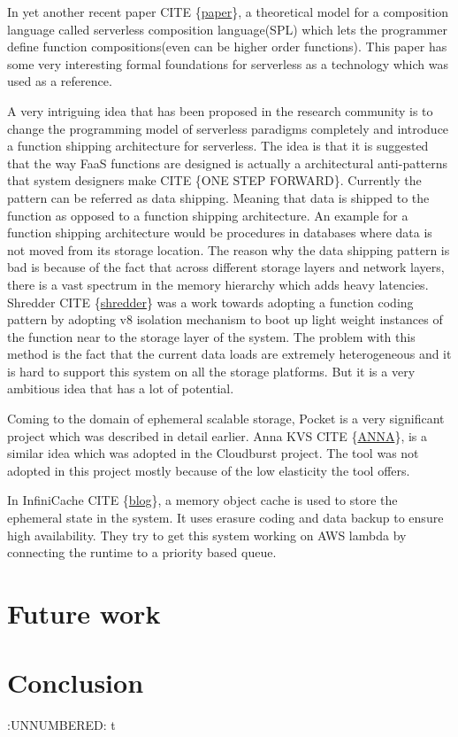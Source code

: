 \documentclass[12pt,titlepage]{article}
\begin{document}
In yet another recent paper CITE \{\href{https://arxiv.org/pdf/1902.05870.pdf}{paper}\}, a theoretical model for a composition
language called serverless composition language(SPL) which lets the programmer
define function compositions(even can be higher order functions). This paper has
some very interesting formal foundations for serverless as a technology which
was used as a reference.

A very intriguing idea that has been proposed in the research community is to
change the programming model of serverless paradigms completely and introduce a
function shipping architecture for serverless. The idea is that it is suggested
that the way FaaS functions are designed is actually a architectural
anti-patterns that system designers make CITE \{ONE STEP FORWARD\}. Currently the
pattern can be referred as data shipping. Meaning that data is shipped to the
function as opposed to a function shipping architecture. An example for a
function shipping architecture would be procedures in databases where data is
not moved from its storage location. The reason why the data shipping pattern is
bad is because of the fact that across different storage layers and network
layers, there is a vast spectrum in the memory hierarchy which adds heavy
latencies. Shredder CITE \{\href{https://www.cs.utah.edu/\~dongx/paper/sandstorm-socc.pdf}{shredder}\} was a work towards adopting a function
coding pattern by adopting v8 isolation mechanism to boot up light weight
instances of the function near to the storage layer of the system. The problem
with this method is the fact that the current data loads are extremely
heterogeneous and it is hard to support this system on all the storage
platforms. But it is a very ambitious idea that has a lot of potential.

Coming to the domain of ephemeral scalable storage, Pocket is a very significant
project which was described in detail earlier. Anna KVS CITE \{\href{https://dsf.berkeley.edu/jmh/papers/anna\_ieee18.pdf}{ANNA}\}, is a
similar idea which was adopted in the Cloudburst project. The tool was not
adopted in this project mostly because of the low elasticity the tool offers.


In InfiniCache CITE \{\href{https://www.usenix.org/conference/fast20/presentation/wang-ao}{blog}\}, a memory object cache is used to store the ephemeral
state in the system. It uses erasure coding and data backup to ensure high availability. 
They try to get this system working on AWS lambda by connecting the runtime to a
priority based queue. 

\section{Future work}
\label{sec:orgf5ba5a8}
\section{Conclusion}
\label{sec:org333cb8b}


:UNNUMBERED: t
\end{document}
